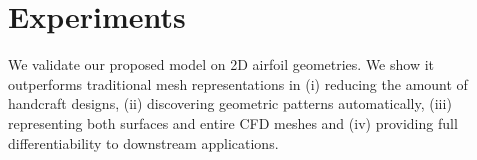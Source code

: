 \section{Experiments}
\label{ch3:sec:Experiments}

We validate our proposed model on 2D airfoil geometries. We show it outperforms traditional mesh representations in (i) reducing the amount of handcraft designs, (ii) discovering geometric patterns automatically, (iii) representing both surfaces and entire CFD meshes and (iv) providing full differentiability to downstream applications.




